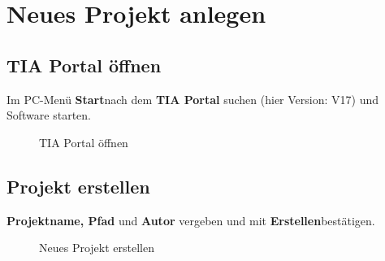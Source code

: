 \section{Neues Projekt anlegen} \label{sec: Neues_Projekt_anlegen}

\subsection{TIA Portal öffnen}
Im PC-Menü \glqq\textbf{Start}\grqq\:nach dem \textbf{TIA Portal} suchen (hier Version: V17) und Software starten.
\begin{figure}[H]
   \centering
   \caption[TIA Portal öffnen]{TIA Portal öffnen}
   \label{fig:Bild2.1}
\end{figure}

\subsection{Projekt erstellen}
\textbf{Projektname, Pfad} und \textbf{Autor} vergeben und mit \glqq\textbf{Erstellen}\grqq\:bestätigen.
\begin{figure}[H]
   \centering
   \caption[Neues Projekt erstellen]{Neues Projekt erstellen}
   \label{fig:Bild2.2}
\end{figure}

\clearpage

